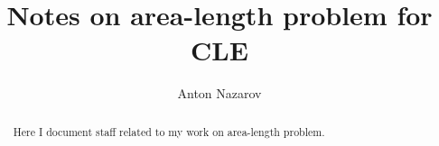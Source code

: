 \documentclass[12pt]{article}
\begin{document}
\title{Notes on area-length problem for CLE}
\author{Anton Nazarov}%

\maketitle

\begin{abstract}
  Here I document staff related to my work on area-length problem.
\end{abstract}
\end{document}
